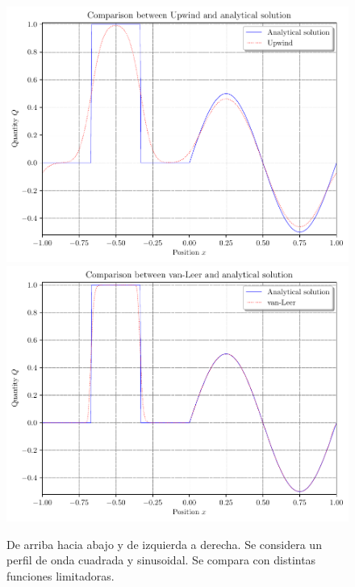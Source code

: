 \begin{figure}[ht!]
	\includegraphics[width=.28\paperwidth]{graphics/Upwind}
	\includegraphics[width=.28\paperwidth]{graphics/van-Leer}
	\caption{De arriba hacia abajo y de izquierda a derecha.
		Se considera un perfil de onda cuadrada y sinusoidal.
		Se compara con distintas funciones limitadoras.}
\end{figure}

\cleardoublepage

